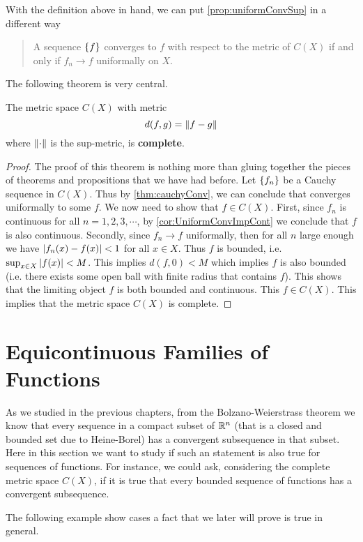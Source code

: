 With the definition above in hand, we can put \autoref{prop:uniformConvSup} in a different way

\begin{quote}
	A sequence $ \{f\} $ converges to $ f $ with respect to the metric of $ C(X) $ if and only if $ f_n \to f $ uniformally on $ X $.
\end{quote}
The following theorem is very central.
\begin{theorem}
	The metric space $  C(X) $ with metric
	\[ d(f,g) = \norm{f-g} \]
	where $ \norm{\cdot} $ is the sup-metric, is \textbf{complete}.
\end{theorem}
\begin{proof}
	The proof of this theorem is nothing more than gluing together the pieces of theorems and propositions that we have had before. Let $ \{f_n\} $ be a Cauchy sequence in $ C(X) $. Thus by \autoref{thm:cauchyConv}, we can conclude that converges uniformally to some $ f $. We now need to show that $  f\in C(X) $. First, since $ f_n $ is continuous for all $ n = 1,2,3,\cdots $, by \autoref{cor:UniformConvImpCont} we conclude that $ f $ is also continuous. Secondly, since $ f_n \to f $ uniformally, then for all $ n $ large enough we have
	$ |f_n(x) - f(x)| < 1 $ for all $  x\in X $. Thus $ f $ is bounded, i.e. $ \sup_{x\in X}|f(x)| < M $. This implies $ d(f,0) < M $ which implies $ f $ is also bounded (i.e. there exists some open ball with finite radius that contains $ f $). This shows that the limiting object $ f $ is both bounded and continuous. This $ f \in C(X) $. This implies that the metric space $ C(X) $ is complete. 
\end{proof}


\section{Equicontinuous Families of Functions}
As we studied in the previous chapters, from the Bolzano-Weierstrass theorem we know that every sequence in a compact subset of $ \mathbb{R}^n $ (that is a closed and bounded set due to Heine-Borel) has a convergent subsequence in that subset. Here in this section we want to study if such an statement is also true for sequences of functions. For instance, we could ask, considering the complete metric space $ C(X) $, if it is true that every bounded sequence of functions has a convergent subsequence.

The following example show cases a fact that we later will prove is true in general. 

